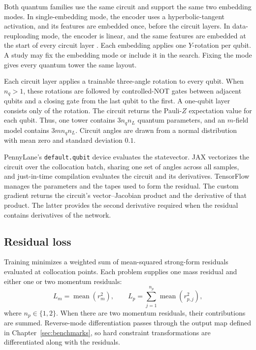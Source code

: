 \documentclass{erdc}
\begin{document}
Both quantum families use the same circuit and support the same two
embedding modes. In single-embedding mode, the encoder uses a
hyperbolic-tangent activation, and its features are embedded once,
before the circuit layers. In data-reuploading mode, the encoder is
linear, and the same features are embedded at the start of every
circuit layer \cite{PerezSalinas2020,Schuld2021}. Each embedding applies one \(Y\)-rotation per qubit. A
study may fix the embedding mode or include it in the search. Fixing
the mode gives every quantum tower the same layout.

Each circuit layer applies a trainable three-angle rotation to every
qubit. When \(n_{q}>1\), these rotations are followed by controlled-NOT
gates between adjacent qubits and a closing gate from the last qubit
to the first. A one-qubit layer consists only of the rotation. The
circuit returns the Pauli-\(Z\) expectation value for each qubit. Thus,
one tower contains \(3n_{q}n_{L}\) quantum parameters, and an
\(m\)-field model contains \(3mn_{q}n_{L}\). Circuit angles are drawn
from a normal distribution with mean zero and standard deviation
\(0.1\).

PennyLane's \texttt{default.qubit} device evaluates the statevector.
JAX vectorizes the circuit over the collocation batch, sharing one set
of angles across all samples, and just-in-time compilation evaluates
the circuit and its derivatives. TensorFlow manages the parameters and
the tapes used to form the residual. The custom gradient returns the
circuit's vector--Jacobian product and the derivative of that product.
The latter provides the second derivative required when the residual
contains derivatives of the network.

\subsection{Residual loss}
\label{sec:loss}

Training minimizes a weighted sum of mean-squared strong-form
residuals evaluated at collocation points. Each problem supplies one
mass residual and either one or two momentum residuals:
\begin{equation}
L_{m}=\operatorname{mean}(r_{m}^{2}),
\qquad
L_{p}=\sum_{j=1}^{n_{p}}\operatorname{mean}(r_{p,j}^{2}),
\end{equation}
where \(n_{p}\in\{1,2\}\). When there are two momentum residuals, their
contributions are summed. Reverse-mode differentiation passes through
the output map defined in Chapter~\ref{sec:benchmarks}, so hard
constraint transformations are differentiated along with the
residuals.
\end{document}
